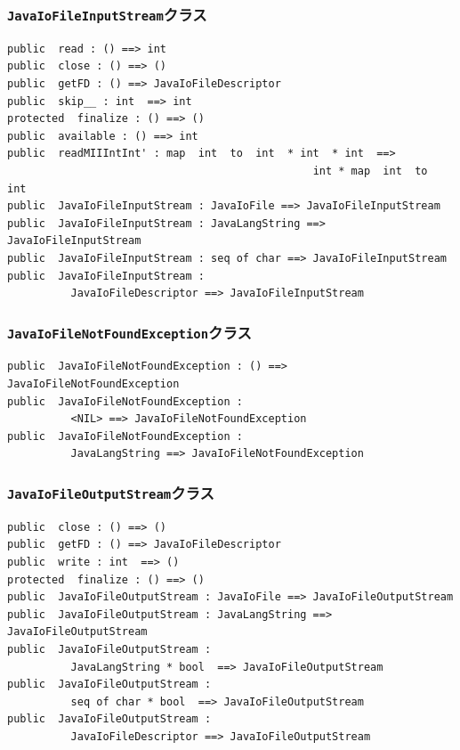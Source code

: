 \documentclass[\pformat,12pt]{jarticle}
\begin{document}
\subsubsection{\texttt{JavaIoFileInputStream}クラス}
\begin{small}
\begin{verbatim}
public  read : () ==> int
public  close : () ==> ()
public  getFD : () ==> JavaIoFileDescriptor
public  skip__ : int  ==> int
protected  finalize : () ==> ()
public  available : () ==> int
public  readMIIIntInt' : map  int  to  int  * int  * int  ==> 
                                                int * map  int  to  int
public  JavaIoFileInputStream : JavaIoFile ==> JavaIoFileInputStream
public  JavaIoFileInputStream : JavaLangString ==> JavaIoFileInputStream
public  JavaIoFileInputStream : seq of char ==> JavaIoFileInputStream
public  JavaIoFileInputStream : 
          JavaIoFileDescriptor ==> JavaIoFileInputStream
\end{verbatim}
\end{small}

\subsubsection{\texttt{JavaIoFileNotFoundException}クラス}
\begin{small}
\begin{verbatim}
public  JavaIoFileNotFoundException : () ==> JavaIoFileNotFoundException
public  JavaIoFileNotFoundException : 
          <NIL> ==> JavaIoFileNotFoundException
public  JavaIoFileNotFoundException : 
          JavaLangString ==> JavaIoFileNotFoundException
\end{verbatim}
\end{small}

\subsubsection{\texttt{JavaIoFileOutputStream}クラス}
\begin{small}
\begin{verbatim}
public  close : () ==> ()
public  getFD : () ==> JavaIoFileDescriptor
public  write : int  ==> ()
protected  finalize : () ==> ()
public  JavaIoFileOutputStream : JavaIoFile ==> JavaIoFileOutputStream
public  JavaIoFileOutputStream : JavaLangString ==> JavaIoFileOutputStream
public  JavaIoFileOutputStream : 
          JavaLangString * bool  ==> JavaIoFileOutputStream
public  JavaIoFileOutputStream : 
          seq of char * bool  ==> JavaIoFileOutputStream
public  JavaIoFileOutputStream : 
          JavaIoFileDescriptor ==> JavaIoFileOutputStream
\end{verbatim}
\end{small}
\end{document}
